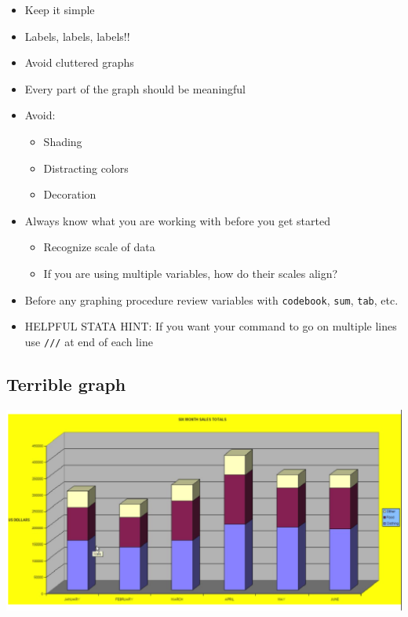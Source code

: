 \documentclass[
]{book}
\providecommand{\tightlist}{%
  \setlength{\itemsep}{0pt}\setlength{\parskip}{0pt}}
\begin{document}
\begin{itemize}
\tightlist
\item
  Keep it simple
\item
  Labels, labels, labels!!
\item
  Avoid cluttered graphs
\item
  Every part of the graph should be meaningful
\item
  Avoid:

  \begin{itemize}
  \tightlist
  \item
    Shading
  \item
    Distracting colors
  \item
    Decoration
  \end{itemize}
\item
  Always know what you are working with before you get started

  \begin{itemize}
  \tightlist
  \item
    Recognize scale of data
  \item
    If you are using multiple variables, how do their scales align?
  \end{itemize}
\item
  Before any graphing procedure review variables with \texttt{codebook}, \texttt{sum}, \texttt{tab}, etc.
\item
  HELPFUL STATA HINT: If you want your command to go on multiple lines use \texttt{///} at end of each line
\end{itemize}

\hypertarget{terrible-graph}{%
\subsection{Terrible graph}\label{terrible-graph}}

\includegraphics{Stata/StataGraphics/images/Terrible.png}
\end{document}

